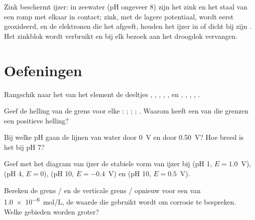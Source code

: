 Zink beschermt ijzer: in zeewater (pH ongeveer 8) zijn het zink en het
staal van een romp met elkaar in contact; zink, met de lagere
potentiaal, wordt eerst geoxideerd, en de elektronen die het afgeeft,
houden het ijzer in of dicht bij zijn . Het zinkblok
wordt verbruikt en bij elk bezoek aan het droogdok vervangen.

\section{Oefeningen}

\begin{exercise}[$\star$]\label{exo:b1:e-ph-diagrams:1}
Rangschik naar het  van het element de deeltjes ,
, , , , en , ,
, , .
\end{exercise}

\begin{exercise}[$\star$]\label{exo:b1:e-ph-diagrams:2}
Geef de helling van de grens voor elke :
; ;
; .
Waarom heeft een van die grenzen een positieve helling?
\end{exercise}

\begin{exercise}[$\star$]\label{exo:b1:e-ph-diagrams:3}
Bij welke pH gaan de lijnen van water door 0~V en door \qty{0.50}{V}?
Hoe breed is het  bij pH 7?
\end{exercise}

\begin{exercise}[$\star$]\label{exo:b1:e-ph-diagrams:4}
Geef met het diagram van ijzer de stabiele vorm van ijzer bij
(pH 1, $E = 1.0$~V), (pH 4, $E = 0$), (pH 10, $E = -0.4$~V) en
(pH 10, $E = 0.5$~V).
\end{exercise}

\begin{exercise}[$\star\star$]\label{exo:b1:e-ph-diagrams:5}
Bereken de grens / en de verticale grens
/ opnieuw voor een  van
\qty{1.0e-6}{mol/L}, de waarde die gebruikt wordt om corrosie te
bespreken. Welke gebieden worden groter?
\end{exercise}

